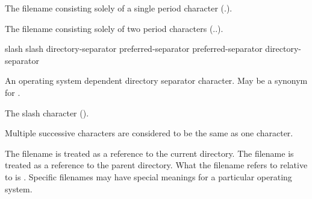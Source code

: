 
\begin{ncbnf}
\br
    \textnormal{The filename consisting solely of a single period character (.).}
\end{ncbnf}

\begin{ncbnf}
\br
    \textnormal{The filename consisting solely of two period characters (..).}
\end{ncbnf}

\begin{ncbnf}
\br
    slash\br
    slash directory-separator\br
    preferred-separator\br
    preferred-separator directory-separator
\end{ncbnf}

\begin{ncbnf}
\br
    \textnormal{An operating system dependent directory separator character. May be a synonym for .}
\end{ncbnf}

\begin{ncbnf}
\br
    \textnormal{The slash character (\tcode{/}).}
\end{ncbnf}

\pnum
Multiple successive  characters are considered to
be the same as one  character.

\pnum
The filename  is treated as a reference to the current directory.
The filename  is treated as a reference to the parent directory.
What the filename  refers to
relative to  is .
Specific filenames may have special meanings for a particular operating system.


